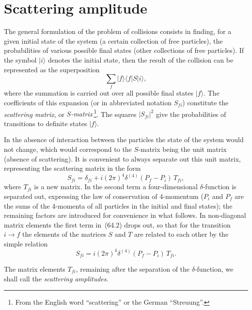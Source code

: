 \section{Scattering amplitude}

The general formulation of the problem of collisions consists in finding, for a given initial state of the system (a certain collection of free particles), the probabilities of various possible final states (other collections of free particles). If the symbol $|i\rangle$ denotes the initial state, then the result of the collision can be represented as the superposition
\begin{equation}
\sum_f|f\rangle\langle f|S|i\rangle,
\tag{64.1}
\end{equation}
where the summation is carried out over all possible final states $|f\rangle$. The coefficients of this expansion (or in abbreviated notation $S_{fi}$) constitute the \textit{scattering matrix}, or \textit{$S$-matrix}\,\footnote{From the English word ``scattering'' or the German ``Streuung''.}. The squares $|S_{fi}|^2$ give the probabilities of transitions to definite states $|f\rangle$.

In the absence of interaction between the particles the state of the system would not change, which would correspond to the $S$-matrix being the unit matrix (absence of scattering). It is convenient to always separate out this unit matrix, representing the scattering matrix in the form
\begin{equation}
S_{fi} = \delta_{fi} + i(2\pi)^4\delta^{(4)}(P_f - P_i)\,T_{fi},
\tag{64.2}
\end{equation}
where $T_{fi}$ is a new matrix. In the second term a four-dimensional $\delta$-function is separated out, expressing the law of conservation of 4-momentum ($P_i$ and $P_f$ are the sums of the 4-momenta of all particles in the initial and final states); the remaining factors are introduced for convenience in what follows. In non-diagonal matrix elements the first term in~(64.2) drops out, so that for the transition $i \to f$ the elements of the matrices $S$ and $T$ are related to each other by the simple relation
\begin{equation}
S_{fi} = i(2\pi)^4\delta^{(4)}(P_f - P_i)\,T_{fi}.
\tag{64.3}
\end{equation}

The matrix elements $T_{fi}$, remaining after the separation of the $\delta$-function, we shall call the \textit{scattering amplitudes}.

